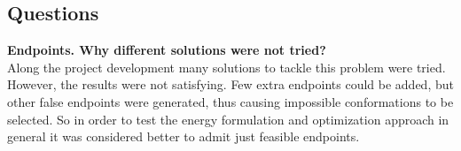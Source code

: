 \documentclass[12pt,letterpaper,oneside]{book}
\begin{document}

\subsection{Questions}
\textbf{Endpoints. Why different solutions were not tried?}\\
Along the project development many solutions to tackle this problem were tried.
However, the results were not satisfying. Few extra endpoints could be added,
but other false endpoints were generated, thus causing impossible conformations
to be selected. 
So in order to test the energy formulation and optimization approach in general
it was considered better to admit just feasible endpoints.
\end{document}
